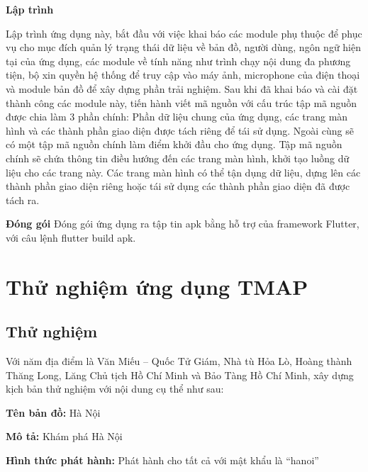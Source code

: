 \textbf{Lập trình}

Lập trình ứng dụng này, bắt đầu với việc khai báo các module phụ thuộc để
phục vụ cho mục đích quản lý trạng thái dữ liệu về bản đồ, người dùng, ngôn ngữ
hiện tại của ứng dụng, các module về tính năng như trình chạy nội dung đa phương
tiện, bộ xin quyền hệ thống để truy cập vào máy ảnh, microphone của điện thoại và
module bản đồ để xây dựng phần trải nghiệm.
Sau khi đã khai báo và cài đặt thành công các module này, tiến hành viết mã
nguồn với cấu trúc tập mã nguồn được chia làm 3 phần chính: Phần dữ liệu chung
của ứng dụng, các trang màn hình và các thành phần giao diện được tách riêng để tái sử dụng. Ngoài cùng sẽ có một tập mã nguồn chính làm điểm khởi đầu cho ứng dụng.
Tập mã nguồn chính sẽ chứa thông tin điều hướng đến các trang màn hình, khởi tạo
luồng dữ liệu cho các trang này. Các trang màn hình có thể tận dụng dữ liệu, dựng
lên các thành phần giao diện riêng hoặc tái sử dụng các thành phần giao diện đã được
tách ra.

\textbf{Đóng gói}
Đóng gói ứng dụng ra tập tin apk bằng hỗ trợ của framework Flutter, với câu
lệnh flutter build apk.

\section{Thử nghiệm ứng dụng TMAP}
\subsection{Thử nghiệm}
Với năm địa điểm là Văn
Miếu – Quốc Tử Giám, Nhà tù Hỏa Lò, Hoàng thành Thăng Long, Lăng Chủ tịch Hồ
Chí Minh và Bảo Tàng Hồ Chí Minh, xây dựng kịch bản thử nghiệm với nội dung
cụ thể như sau:

\textbf{Tên bản đồ:} Hà Nội

\textbf{Mô tả:} Khám phá Hà Nội

\textbf{Hình thức phát hành:} Phát hành cho tất cả với mật khẩu là “hanoi”

